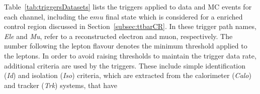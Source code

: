 Table~\ref{tab:triggersDatasets} lists the triggers applied to data and MC events for each channel, including the e$mu$ final state which is considered for a \ttbar enriched control region discussed in Section~\ref{subsec:ttbarCR}.
In these trigger path names, \emph{Ele} and \emph{Mu}, refer to a reconstructed electron and muon, respectively.
The number following the lepton flavour denotes the minimum \pT threshold applied to the leptons.
In order to avoid raising \pT thresholds to maintain the trigger data rate, additional criteria are used by the triggers.
These include simple identification (\emph{Id}) and isolation (\emph{Iso}) criteria, which are extracted from the calorimeter (\emph{Calo}) and tracker (\emph{Trk}) systems, that have 


\begin{table}[htbp]
\label{tab:triggersDatasets}
  \centering
\end{table}

